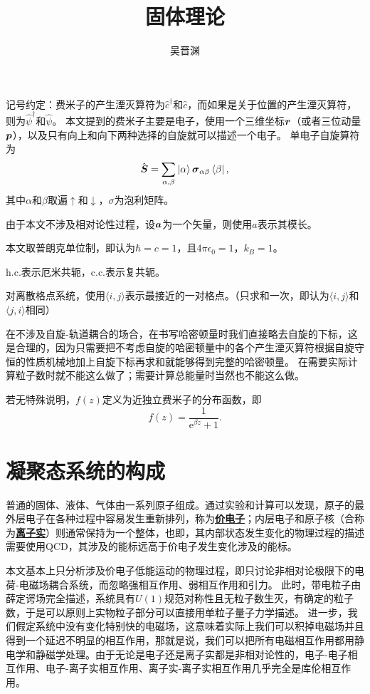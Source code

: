 \documentclass[hyperref, UTF8, a4paper]{ctexart}
\title{固体理论}
\author{吴晋渊}
\newcommand*{\ee}{\mathrm{e}}
\newcommand*{\pair}[1]{\langle #1 \rangle}
\newcommand*{\concept}[1]{\underline{\textbf{#1}}}
\begin{document}
\maketitle

记号约定：费米子的产生湮灭算符为$\hat{c}^\dagger$和$\hat{c}$，而如果是关于位置的产生湮灭算符，则为$\hat{\psi}^\dagger$和$\hat{\psi}$。
本文提到的费米子主要是电子，使用一个三维坐标$\vb*{r}$（或者三位动量$\vb*{p}$），以及只有向上和向下两种选择的自旋就可以描述一个电子。
单电子自旋算符为
\[
    \hat{\vb*{S}} = \sum_{\alpha, \beta} \ket{\alpha} \vb*{\sigma}_{\alpha \beta} \bra{\beta},
\]
其中$\alpha$和$\beta$取遍$\uparrow$和$\downarrow$，$\sigma$为泡利矩阵。

由于本文不涉及相对论性过程，设$\vb*{a}$为一个矢量，则使用$a$表示其模长。

本文取普朗克单位制，即认为$\hbar=c=1$，且$4\pi\epsilon_0=1$，$k_B=1$。

$\text{h.c.}$表示厄米共轭，$\text{c.c.}$表示复共轭。

对离散格点系统，使用$\pair{i, j}$表示最接近的一对格点。（只求和一次，即认为$\pair{i, j}$和$\pair{j, i}$相同）

在不涉及自旋-轨道耦合的场合，在书写哈密顿量时我们直接略去自旋的下标，这是合理的，因为只需要把不考虑自旋的哈密顿量中的各个产生湮灭算符根据自旋守恒的性质机械地加上自旋下标再求和就能够得到完整的哈密顿量。
在需要实际计算粒子数时就不能这么做了；需要计算总能量时当然也不能这么做。

若无特殊说明，$f(z)$定义为近独立费米子的分布函数，即
\[
    f(z) = \frac{1}{\ee^{\beta z} + 1}.
\]

\section{凝聚态系统的构成}

普通的固体、液体、气体由一系列原子组成。通过实验和计算可以发现，原子的最外层电子在各种过程中容易发生重新排列，称为\concept{价电子}；内层电子和原子核（合称为\concept{离子实}）则通常保持为一个整体，也即，其内部状态发生变化的物理过程的描述需要使用QCD，其涉及的能标远高于价电子发生变化涉及的能标。

本文基本上只分析涉及价电子低能运动的物理过程，即只讨论非相对论极限下的电荷-电磁场耦合系统，而忽略强相互作用、弱相互作用和引力。
此时，带电粒子由薛定谔场完全描述，系统具有$U(1)$规范对称性且无粒子数生灭，有确定的粒子数，于是可以原则上实物粒子部分可以直接用单粒子量子力学描述。
进一步，我们假定系统中没有变化特别快的电磁场，这意味着实际上我们可以积掉电磁场并且得到一个延迟不明显的相互作用，那就是说，我们可以把所有电磁相互作用都用静电学和静磁学处理。由于无论是电子还是离子实都是非相对论性的，电子-电子相互作用、电子-离子实相互作用、离子实-离子实相互作用几乎完全是库伦相互作用。
\end{document}
